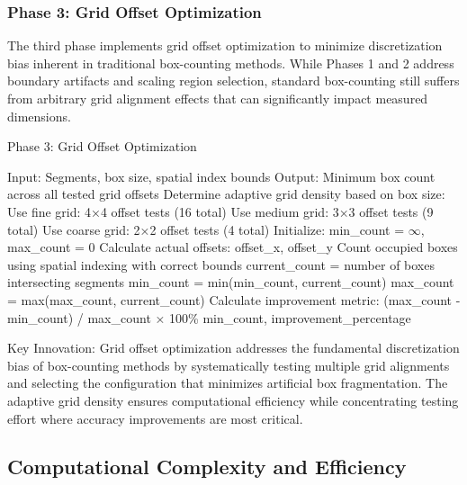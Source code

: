 \documentclass[preprint,12pt]{elsarticle}
\def\textbf#1{#1}%
\begin{document}
\subsubsection{Phase 3: Grid Offset Optimization}

The third phase implements grid offset optimization to minimize discretization bias inherent in traditional box-counting methods. While Phases 1 and 2 address boundary artifacts and scaling region selection, standard box-counting still suffers from arbitrary grid alignment effects that can significantly impact measured dimensions.

\begin{algorithm}[H]
\caption{Phase 3: Grid Offset Optimization}
\label{alg:phase3}
\begin{algorithmic}[1]
\small
\State \textbf{Input:} Segments, box size, spatial index bounds
\State \textbf{Output:} Minimum box count across all tested grid offsets
\State
\State Determine adaptive grid density based on box size:
    \State Use fine grid: 4×4 offset tests (16 total)
    \State Use medium grid: 3×3 offset tests (9 total)
\Else
    \State Use coarse grid: 2×2 offset tests (4 total)
\EndIf
\State
\State Initialize: min\_count = $\infty$, max\_count = 0
    \State Calculate actual offsets: offset\_x, offset\_y
    \State Count occupied boxes using spatial indexing with correct bounds
    \State current\_count = number of boxes intersecting segments
    \State min\_count = min(min\_count, current\_count)
    \State max\_count = max(max\_count, current\_count)
\EndFor
\State
\State Calculate improvement metric: (max\_count - min\_count) / max\_count × 100\%
\State \Return min\_count, improvement\_percentage
\end{algorithmic}
\end{algorithm}

\textbf{Key Innovation}: Grid offset optimization addresses the fundamental discretization bias of box-counting methods by systematically testing multiple grid alignments and selecting the configuration that minimizes artificial box fragmentation. The adaptive grid density ensures computational efficiency while concentrating testing effort where accuracy improvements are most critical.

\subsection{Computational Complexity and Efficiency}
\end{document}
